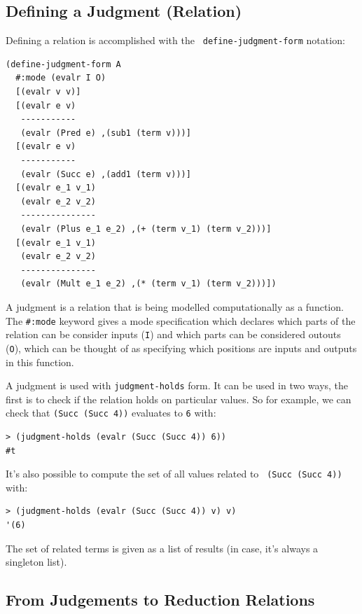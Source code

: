 \subsection{Defining a Judgment (Relation)}

Defining a relation is accomplished with the {\tt
  define-judgment-form} notation:
\begin{verbatim}
(define-judgment-form A
  #:mode (evalr I O)
  [(evalr v v)]
  [(evalr e v)
   -----------
   (evalr (Pred e) ,(sub1 (term v)))]
  [(evalr e v)
   -----------
   (evalr (Succ e) ,(add1 (term v)))]  
  [(evalr e_1 v_1)
   (evalr e_2 v_2)
   ---------------
   (evalr (Plus e_1 e_2) ,(+ (term v_1) (term v_2)))]
  [(evalr e_1 v_1)
   (evalr e_2 v_2)
   ---------------
   (evalr (Mult e_1 e_2) ,(* (term v_1) (term v_2)))])
\end{verbatim}

A judgment is a relation that is being modelled computationally as a
function.  The {\tt \#:mode} keyword gives a mode specification which
declares which parts of the relation can be consider inputs ({\tt I})
and which parts can be considered outouts ({\tt O}), which can be
thought of as specifying which positions are inputs and outputs in
this function.

A judgment is used with {\tt judgment-holds} form.  It can be used in
two ways, the first is to check if the relation holds on particular
values.  So for example, we can check that {\tt (Succ (Succ 4))}
evaluates to {\tt 6} with:
\begin{verbatim}
> (judgment-holds (evalr (Succ (Succ 4)) 6))
#t
\end{verbatim}
It's also possible to compute the set of all values related to {\tt
  (Succ (Succ 4))} with:
\begin{verbatim}
> (judgment-holds (evalr (Succ (Succ 4)) v) v)
'(6)
\end{verbatim}
The set of related terms is given as a list of results (in case, it's
always a singleton list).

\subsection{From Judgements to Reduction Relations}

